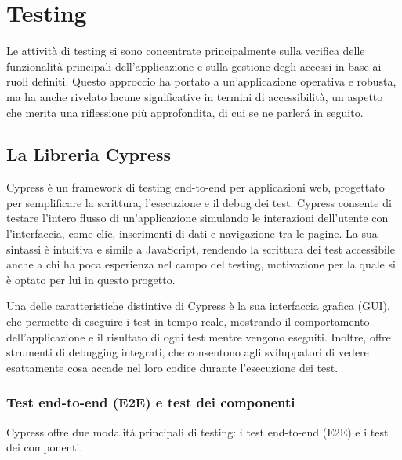 \documentclass[target=bach,aauheader=,style=]{thud}
\begin{document}
\chapter{Testing}
Le attività di testing si sono concentrate principalmente sulla verifica delle funzionalità principali dell'applicazione e sulla gestione degli accessi in base ai ruoli definiti. Questo approccio ha portato a un'applicazione operativa e robusta, ma ha anche rivelato lacune significative in termini di accessibilità, un aspetto che merita una riflessione più approfondita, di cui se ne parlerá in seguito.

\section{La Libreria Cypress}
Cypress è un framework di testing end-to-end per applicazioni web, progettato per semplificare la scrittura, l'esecuzione e il debug dei test. Cypress consente di testare l'intero flusso di un'applicazione simulando le interazioni dell'utente con l'interfaccia, come clic, inserimenti di dati e navigazione tra le pagine. La sua sintassi è intuitiva e simile a JavaScript, rendendo la scrittura dei test accessibile anche a chi ha poca esperienza nel campo del testing, motivazione per la quale si è optato per lui in questo progetto.

\noindent Una delle caratteristiche distintive di Cypress è la sua interfaccia grafica (GUI), che permette di eseguire i test in tempo reale, mostrando il comportamento dell'applicazione e il risultato di ogni test mentre vengono eseguiti. Inoltre, offre strumenti di debugging integrati, che consentono agli sviluppatori di vedere esattamente cosa accade nel loro codice durante l'esecuzione dei test.

\subsection{Test end-to-end (E2E) e test dei componenti}
Cypress offre due modalità principali di testing: i test end-to-end (E2E) e i test dei componenti.
\end{document}

